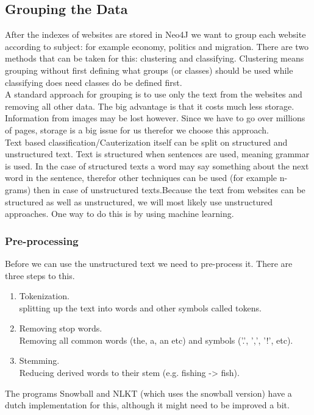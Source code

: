 \subsection{Grouping the Data}
After the indexes of websites are stored in Neo4J we want to group each website according to subject: for example economy, politics and migration. There are two methods that can be taken for this: clustering and classifying. Clustering means grouping without first defining what groups (or classes) should be used while classifying does need classes do be defined first. \\
A standard approach for grouping is to use only the text from the websites and removing all other data. The big advantage is that it costs much less storage. Information from images may be lost however. Since we have to go over millions of pages, storage is a big issue for us therefor we choose this approach. \\
Text based classification/Cauterization itself can be split on structured and unstructured text. Text is structured when sentences are used, meaning grammar is used. In the case of structured texts a word may say something about the next word in the sentence, therefor other techniques can be used (for example n-grams) then in case of unstructured texts.Because the text from websites can be structured as well as unstructured, we will most likely use unstructured approaches. One way to do this is by using machine learning.

\subsubsection{Pre-processing}
Before we can use the unstructured text we need to pre-process it. There are three steps to this. 
\begin{enumerate}
\item Tokenization. \\ splitting up the text into words and other symbols called tokens.
\item Removing stop words. \\ Removing all common words (the, a, an etc) and symbols ('.', ',', '!', etc). 
\item Stemming. \\ Reducing derived words to their stem (e.g. fishing -> fish).
\end{enumerate}
The programs Snowball \cite{snowball_dutch} and NLKT \cite{nlkt_stemming} (which uses the snowball version) have a dutch implementation for this, although it might need to be improved a bit.

